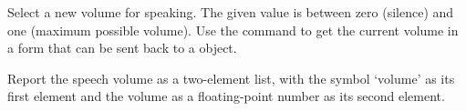   Select a new volume for speaking.
  The given value is between zero (silence) and one (maximum possible volume).
  Use the  command to get the current volume in a form that can be sent back to a
   object.
  
  Report the speech volume as a two-element list, with the symbol `volume' as its first element and
  the volume as a floating-point number as its second element.
 
  \objListCmdEnd

\objItemFile

\objItemMessage

\objItemComments

